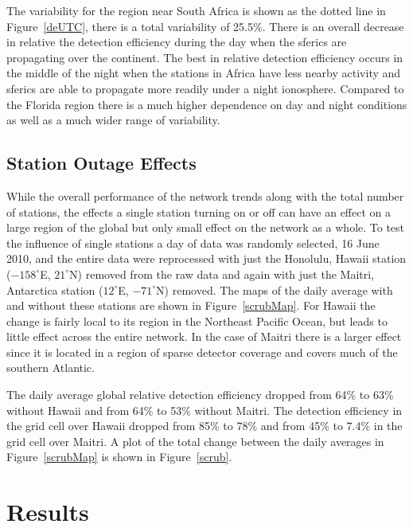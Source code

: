 \documentclass[draft,ras]{agutex}
\begin{document}
\begin{article}
The variability for the region near South Africa is shown as the dotted line in Figure~\ref{deUTC}, there is a total variability of 25.5\%. There is an overall decrease in relative the detection efficiency during the day when the sferics are propagating over the continent. The best in relative detection efficiency occurs in the middle of the night when the stations in Africa have less nearby activity and sferics are able to propagate more readily under a night ionosphere. Compared to the Florida region there is a much higher dependence on day and night conditions as well as a much wider range of variability.

\subsection{Station Outage Effects}

While the overall performance of the network trends along with the total number of stations, the effects  a single station turning on or off can have an effect on a large region of the global but only small effect on the network as a whole. To test the influence of single stations a day of data was randomly selected, 16 June 2010, and the entire data were reprocessed with just the Honolulu, Hawaii station ($-158^\circ$E, $21^\circ$N) removed from the raw data and again with just the Maitri, Antarctica station ($12^\circ$E, $-71^\circ$N) removed. The maps of the daily average with and without these stations are shown in Figure~\ref{scrubMap}. For Hawaii the change is fairly local to its region in the Northeast Pacific Ocean, but leads to little effect across the entire network.  In the case of Maitri there is a larger effect since it is located in a region of sparse detector coverage and covers much of the southern Atlantic.

The daily average global relative detection efficiency dropped from 64\% to 63\% without Hawaii and from 64\% to 53\% without Maitri. The detection efficiency in the grid cell over Hawaii dropped from 85\% to 78\% and from 45\% to 7.4\% in the grid cell over Maitri. A plot of the total change between the daily averages in Figure~\ref{scrubMap} is shown in Figure~\ref{scrub}. 

\section{Results}


\end{article}
\end{document}
